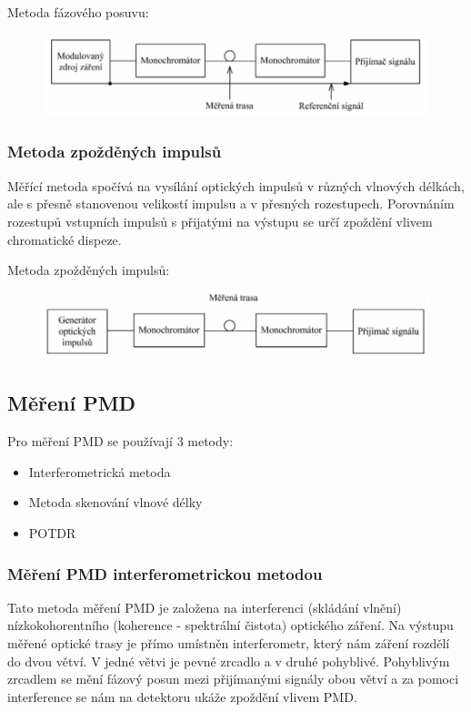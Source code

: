 Metoda fázového posuvu:
\begin{figure}[!ht]
\begin{center}
    \includegraphics[scale=1]{obrazky/chrommer.png}
  \end{center}
\end{figure}

\subsubsection{Metoda zpožděných impulsů}
Měřící metoda spočívá na vysílání optických impulsů v různých vlnových délkách, ale s přesně stanovenou velikostí impulsu a v přesných rozestupech. Porovnáním rozestupů vstupních impulsů s přijatými na výstupu se určí zpoždění vlivem chromatické dispeze. 

Metoda zpožděných impulsů:
\begin{figure}[!ht]
\begin{center}
    \includegraphics[scale=1]{obrazky/chrommer2.png}
  \end{center}
\end{figure}

\subsection{Měření PMD}
Pro měření PMD se používají 3 metody:
\begin{itemize}
    \item Interferometrická metoda
    \item Metoda skenování vlnové délky
    \item POTDR
\end{itemize}

\subsubsection{Měření PMD interferometrickou metodou}
Tato metoda měření PMD je založena na interferenci (skládání vlnění) nízkokohorentního (koherence - spektrální čistota) optického záření. Na výstupu měřené optické trasy je přímo umístněn interferometr, který nám záření rozdělí do dvou větví. V jedné větvi je pevné zrcadlo a v druhé pohyblivé. Pohyblivým zrcadlem se mění fázový posun mezi přijímanými signály obou větví a za pomoci interference se nám na detektoru ukáže zpoždění vlivem PMD. 

